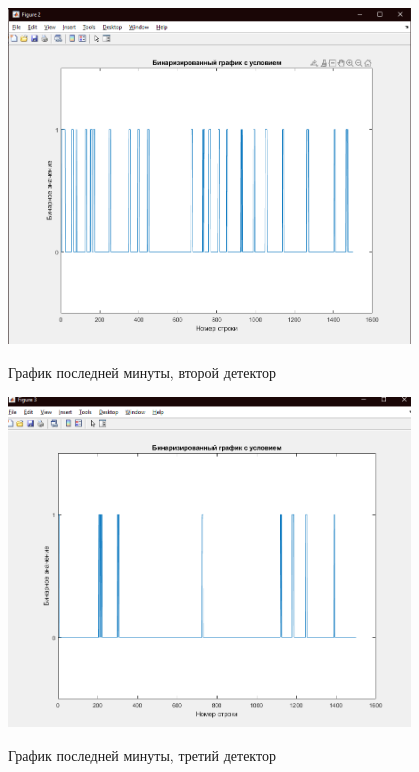\documentclass[a4paper,12pt]{article}
\begin{document}
\begin{center}
\includegraphics[width=0.8\textwidth]{images/binary/binary_last_2.png}
\end{center}
\begin{center}
График последней минуты, второй детектор
\end{center}

\begin{center}
\includegraphics[width=0.8\textwidth]{images/binary/binary_last_3.png}
\end{center}
\begin{center}
График последней минуты, третий детектор
\end{center}


\newpage
\end{document}
